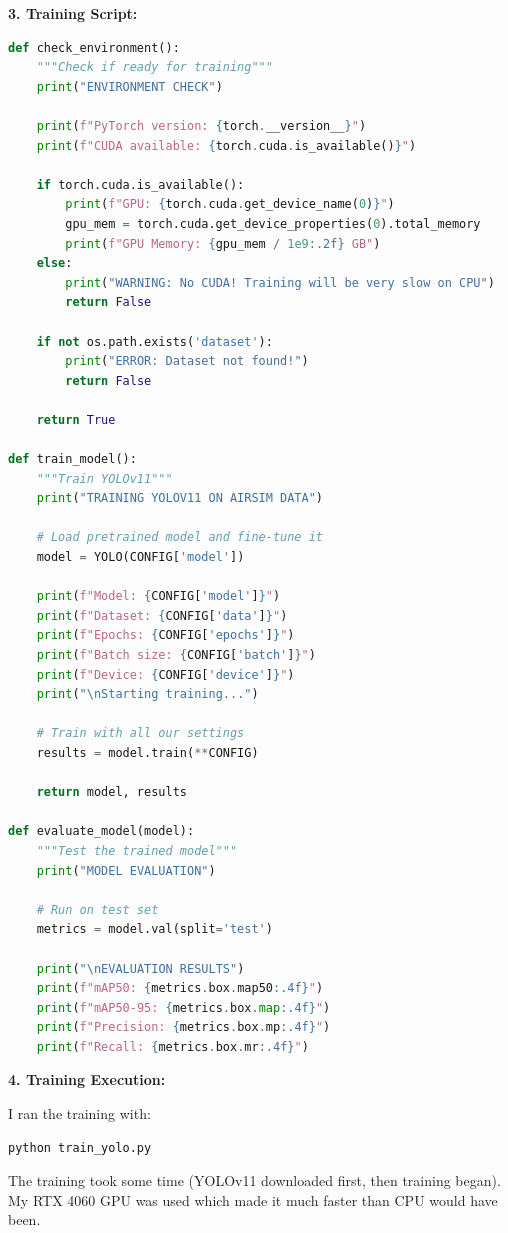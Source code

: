 \textbf{3. Training Script:}
\begin{lstlisting}[language=Python]
def check_environment():
    """Check if ready for training"""
    print("ENVIRONMENT CHECK")
    
    print(f"PyTorch version: {torch.__version__}")
    print(f"CUDA available: {torch.cuda.is_available()}")
    
    if torch.cuda.is_available():
        print(f"GPU: {torch.cuda.get_device_name(0)}")
        gpu_mem = torch.cuda.get_device_properties(0).total_memory
        print(f"GPU Memory: {gpu_mem / 1e9:.2f} GB")
    else:
        print("WARNING: No CUDA! Training will be very slow on CPU")
        return False
    
    if not os.path.exists('dataset'):
        print("ERROR: Dataset not found!")
        return False
    
    return True

def train_model():
    """Train YOLOv11"""
    print("TRAINING YOLOV11 ON AIRSIM DATA")
    
    # Load pretrained model and fine-tune it
    model = YOLO(CONFIG['model'])
    
    print(f"Model: {CONFIG['model']}")
    print(f"Dataset: {CONFIG['data']}")
    print(f"Epochs: {CONFIG['epochs']}")
    print(f"Batch size: {CONFIG['batch']}")
    print(f"Device: {CONFIG['device']}")
    print("\nStarting training...")
    
    # Train with all our settings
    results = model.train(**CONFIG)
    
    return model, results

def evaluate_model(model):
    """Test the trained model"""
    print("MODEL EVALUATION")
    
    # Run on test set
    metrics = model.val(split='test')
    
    print("\nEVALUATION RESULTS")
    print(f"mAP50: {metrics.box.map50:.4f}")
    print(f"mAP50-95: {metrics.box.map:.4f}")
    print(f"Precision: {metrics.box.mp:.4f}")
    print(f"Recall: {metrics.box.mr:.4f}")
\end{lstlisting}

\textbf{4. Training Execution:}

I ran the training with:
\begin{verbatim}
python train_yolo.py
\end{verbatim}

The training took some time (YOLOv11 downloaded first, then training began). My RTX 4060 GPU was used which made it much faster than CPU would have been.

